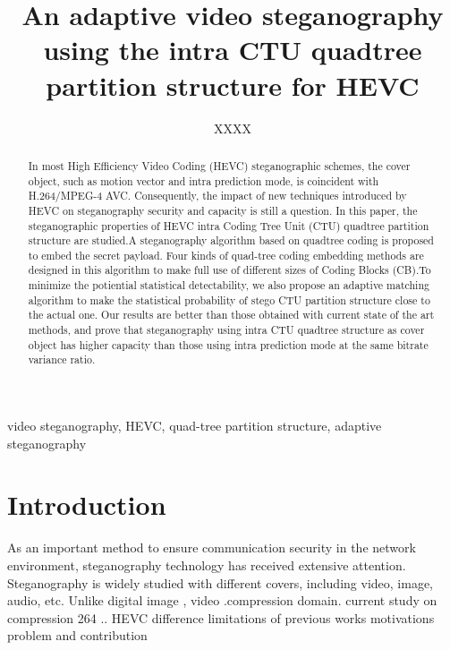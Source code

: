 \documentclass[journal,sort]{IEEEtran}
\begin{document}
\title{An adaptive video steganography using the intra CTU quadtree partition structure for HEVC}
\author{XXXX}
	

\maketitle

\begin{abstract}
In most High Efficiency Video Coding (HEVC) steganographic schemes, the cover object, such as motion vector and intra prediction mode, is coincident with H.264/MPEG-4 AVC. Consequently, the impact of new techniques introduced by HEVC on steganography security and capacity is still a question. In this paper, the steganographic properties of HEVC intra Coding Tree Unit (CTU) quadtree partition structure are studied.A steganography algorithm based on quadtree coding is proposed to embed the secret payload. Four kinds of quad-tree coding embedding methods are designed in this algorithm to make full use of different sizes of Coding Blocks (CB).To minimize the potiential statistical detectability, we also propose an adaptive matching algorithm to make the statistical probability of stego CTU partition structure close to the actual one. Our results are better
than those obtained with current state of the art methods, and prove that steganography using intra CTU quadtree structure as cover object has higher capacity than those using intra prediction mode at the same bitrate variance ratio.

	
	
\end{abstract}	
\begin{IEEEkeywords}
		video steganography, HEVC, quad-tree partition structure, adaptive steganography
\end{IEEEkeywords}
	
\section{Introduction\label{intro}}
	
As an important method to ensure communication security in the network environment, steganography technology has received extensive attention.  Steganography is widely studied with different covers, including  video, image, audio, etc. Unlike digital image , video .compression domain. 
current study on compression 264 ..
HEVC difference
limitations of previous works
motivations
problem and contribution 
\end{document}
